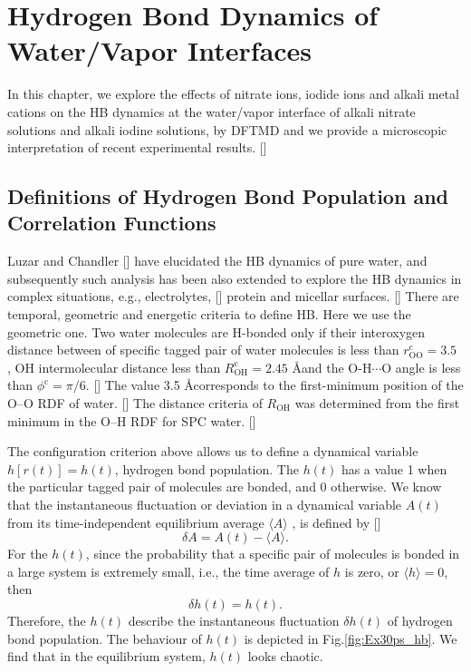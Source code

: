 \chapter{Hydrogen Bond Dynamics of Water/Vapor Interfaces }\label{CHAPTER_HB}
In this chapter, we explore the effects of nitrate ions, iodide ions and alkali metal cations 
on the HB dynamics at the water/vapor interface of alkali nitrate solutions and alkali
iodine solutions, by DFTMD 
and we provide a microscopic interpretation of recent experimental results. [\cite{HuaWei2014}]

\section{Definitions of Hydrogen Bond Population and Correlation Functions}
Luzar and Chandler [\cite{AL96}] have elucidated the HB dynamics of pure water, and
subsequently such analysis has been also extended to explore the HB dynamics
in complex situations, e.g., electrolytes, [\cite{AC00}] protein and  micellar surfaces. [\cite{SP05}]
There are temporal, geometric and energetic criteria to define HB. Here we use the geometric one.
Two water molecules are H-bonded only if their interoxygen distance between of specific tagged pair of water molecules 
is less than $r^{\text{c}}_{\text{OO}}=3.5$ \A, OH intermolecular distance less than $R^{\text{c}}_{\text{OH}}=2.45$ \AA and 
the O-H$\cdots$O angle is less than $\phi^{\text{c}}=\pi/6$. [\cite{AKS86,JT90,SB02}] 
The value 3.5 \AA corresponds to the first-minimum position of the O--O RDF of water. [\cite{Sciortino1989}]   
The distance criteria of $R_{\text{OH}}$  was determined from the first minimum in the O--H RDF for SPC water. [\cite{HJCB81}]

The configuration criterion above allows us to define a dynamical variable $h[r(t)] = h(t)$, hydrogen bond population. 
The $h(t)$ has a value 1 when the particular tagged pair of molecules are bonded, and 0 otherwise. 
We know that the instantaneous fluctuation or deviation in a dynamical variable $A(t)$ from its time-independent equilibrium average $\langle A\rangle$ , 
is defined by [\cite{DC87}] 
$$
\delta A = A(t) - \langle A\rangle.
$$
For the $h(t)$, since the probability that a specific pair of molecules is bonded in a large system is extremely small, i.e., 
the time average of $h$ is zero, or  
$\langle h \rangle = 0$,
then 
$$
\delta h(t) = h(t).
$$
Therefore, the $h(t)$ describe the instantaneous fluctuation $\delta h(t)$  of hydrogen bond population.  
The behaviour of $h(t)$  is depicted in Fig.\ref{fig:Ex30ps_hb}. We find that in the equilibrium system, $h(t)$ looks chaotic.

